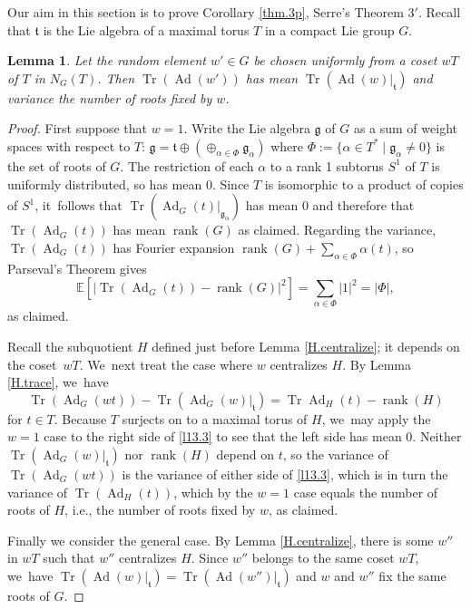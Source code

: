 \documentclass[JEP,XML,SOM,Unicode,NoFloatCountersInSection,published]{cedram}
\newtheorem{lem}[equation]{Lemma}
\theoremstyle{definition}
\newcommand{\mfg}{\mathfrak{g}}
\newcommand{\mft}{\mathfrak{t}}
\newcommand{\E}{\mathbb{E}}
\DeclareMathOperator{\Tr}{Tr}
\DeclareMathOperator{\Ad}{Ad}
\DeclareMathOperator{\rank}{rank}
\begin{document}
Our aim in this section is to prove Corollary \ref{thm.3p}, Serre's Theorem $3'$. Recall that $\mft$ is the Lie algebra of a maximal torus $T$ in a compact Lie group $G$.

\begin{lem} \label{mean.val}
Let the random element $w' \in G$ be chosen uniformly from a coset $wT$ of
$T$ in $N_G(T)$. Then $\Tr(\Ad(w'))$ has mean $\Tr(\Ad(w)|_{\mft})$ and
variance the number of roots fixed by $w$.
\end{lem}

\begin{proof}
First suppose that $w = 1$. Write the Lie algebra $\mfg$ of $G$ as a sum of weight spaces with respect to $T$: $\mfg = \mft \oplus \left( \oplus_{\alpha \in \Phi} \mfg_\alpha \right)$ where $\Phi := \{ \alpha \in T^* \mid \mfg_\alpha \ne 0 \}$ is the set of roots of $G$. The restriction of each $\alpha$ to a rank 1 subtorus $S^1$ of $T$ is uniformly distributed, so has mean 0. Since $T$ is isomorphic to a product of copies of $S^1$, it~follows that $\Tr(\Ad_G(t) \vert_{\mfg_\alpha})$ has mean 0 and therefore that $\Tr(\Ad_G(t))$ has mean $\rank(G)$ as claimed.
Regarding the variance, $\Tr(\Ad_G(t))$ has Fourier expansion $\rank(G) + \sum_{\alpha \in \Phi} \alpha(t)$, so Parseval's Theorem gives
\[
\E\left[\left|\Tr(\Ad_G(t))-\rank(G)\right|^2\right] = \sum_{\alpha \in \Phi} \left| 1 \right|^2 = \left| \Phi \right|,
\]
as claimed.

Recall the subquotient $H$ defined just before Lemma \ref{H.centralize}; it depends on the coset~$wT$. We~next treat the case where $w$ centralizes $H$.
By Lemma \ref{H.trace}, we~have
\begin{equation} \label{l13.3}
\Tr(\Ad_G(wt)) - \Tr(\Ad_G(w)\vert_\mft) = \Tr \Ad_H(t) - \rank(H)
\end{equation}
for $t \in T$. Because $T$ surjects on to a maximal torus of $H$, we~may apply the $w = 1$ case to the right side of \eqref{l13.3} to see that the left side has mean 0. Neither $\Tr(\Ad_G(w)\vert_\mft)$ nor $\rank(H)$ depend on $t$, so the variance of $\Tr(\Ad_G(wt))$ is the variance of either side of \eqref{l13.3}, which is in turn the variance of $\Tr(\Ad_H(t))$, which by the $w = 1$ case equals the number of roots of $H$, i.e., the number of roots fixed by $w$, as claimed.

Finally we consider the general case. By Lemma \ref{H.centralize}, there is some $w''$ in $wT$ such that $w''$ centralizes $H$. Since $w''$ belongs to the same coset $wT$, we~have $\Tr(\Ad(w)\vert_\mft) = \Tr(\Ad(w'')\vert_\mft)$ and $w$ and $w''$ fix the same roots of $G$.
\end{proof}
\end{document}
